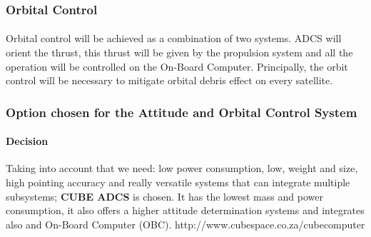 \subsubsection{Orbital Control}
\paragraph{} Orbital control will be achieved as a combination of two systems. ADCS will orient the thrust, this thrust will be given by the propulsion system and all the operation will be controlled on the On-Board Computer. Principally, the orbit control will be necessary to mitigate orbital debris effect on every satellite.

\subsubsection{Option chosen for the Attitude and Orbital Control System}

\paragraph{Decision} 
Taking into account that we need: low power consumption, low, weight and size, high pointing accuracy and really versatile systems that can integrate multiple subsystems; \textbf{CUBE ADCS} is chosen. It has the lowest mass and power consumption, it also offers a higher attitude determination systems and integrates also and On-Board Computer (OBC).
http://www.cubespace.co.za/cubecomputer 


